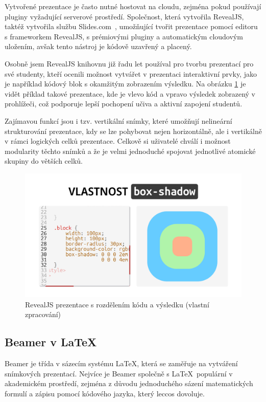 Vytvořené prezentace je často nutné hostovat na cloudu, zejména pokud používají pluginy vyžadující serverové prostředí.
Společnost, která vytvořila RevealJS, taktéž vytvořila službu Slides.com~\cite{revealjs, slidescom}, umožňující tvořit prezentace pomocí editoru s frameworkem RevealJS, s prémiovými pluginy a automatickým cloudovým uložením, avšak tento nástroj je kódově uzavřený a placený. 

Osobně jsem RevealJS knihovnu již řadu let používal pro tvorbu prezentací pro své studenty, kteří ocenili možnost vytvářet v prezentaci interaktivní prvky, jako je například kódový blok s okamžitým zobrazením výsledku. 
Na obrázku \ref{fig:analyza:revealjs-ukazka} je vidět příklad takové prezentace, kde je vlevo kód a vpravo výsledek zobrazený v prohlížeči, což podporuje lepší pochopení učiva a aktivní zapojení studentů. 

Zajímavou funkcí jsou i tzv. vertikální snímky, které umožňují nelineární strukturování prezentace, kdy se lze pohybovat nejen horizontálně, ale i vertikálně v rámci logických celků prezentace.
Celkově si uživatelé chválí i možnost modularity těchto snímků a že je velmi jednoduché spojovat jednotlivé atomické skupiny do větších celků.


\begin{figure}[h!]
    \centering
    \includegraphics[width=0.9\linewidth]{media/03_analyza/revealjs.png}
    \caption[RevealJS prezentace s rozdělením kódu a výsledku]{RevealJS prezentace s rozdělením kódu a výsledku (vlastní zpracování)}\label{fig:analyza:revealjs-ukazka}
\end{figure}

\subsection{Beamer v \LaTeX}

Beamer je třída v sázecím systému \LaTeX, která se zaměřuje na vytváření snímkových prezentací.
Nejvíce je Beamer společně s \LaTeX~populární v akademickém prostředí, zejména z důvodu jednoduchého sázení matematických formulí a zápisu pomocí kódového jazyka, který leccos dovoluje. 

